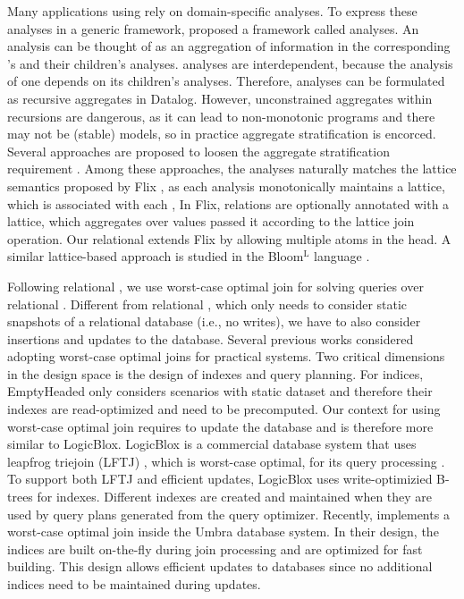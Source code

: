 Many applications using \egraphs rely on domain-specific analyses.
To express these analyses in a generic \egraph framework, 
 \egg proposed a framework called \eclass analyses.
An \eclass analysis can be thought of as an aggregation of 
 information in the corresponding \eclass's \enodes and their children's \eclass analyses.
\Eclass analyses are interdependent,
 because the \eclass analysis of one \eclass depends on its children's \eclass analyses.
Therefore,
 \eclass analyses can be formulated as recursive aggregates in Datalog.
However, unconstrained aggregates within recursions are dangerous, 
 as it can lead to non-monotonic programs and there may not be (stable) models,
 so in practice aggregate stratification is encorced.
Several approaches are proposed to loosen the aggregate stratification requirement 
 \citep{mono-agg,bloom-lattice,datalogo,prov-semiring,flix}.
Among these approaches,
 the \eclass analyses naturally matches the lattice semantics proposed by Flix \citep{flix},
 as each \eclass analysis monotonically maintains a lattice, which is associated with each \eclass,
In Flix, relations are optionally annotated with a lattice,
 which aggregates over values passed it according to the lattice join operation.
Our relational \egraphs extends Flix by allowing multiple atoms in the head.
A similar lattice-based approach is studied 
 in the Bloom$^\text{L}$ language \citep{bloom-lattice}.

Following relational \ematching \citep{relational-ematching}, 
 we use worst-case optimal join for solving queries over relational \egraphs.
Different from relational \ematching,
 which only needs to consider static snapshots of a relational database
 (i.e., no writes),
 we have to also consider insertions and updates to the database.
Several previous works considered 
 adopting worst-case optimal joins for practical systems.
Two critical dimensions in the design space is the design of indexes
 and query planning.
For indices,
 EmptyHeaded only considers scenarios with static dataset \citep{emptyheaded}
 and therefore their indexes are read-optimized and need to be precomputed.
Our context for using worst-case optimal join requires to update the database
 and is therefore more similar to LogicBlox.
LogicBlox is a commercial database system that uses leapfrog triejoin (LFTJ) \citep{lftj}, 
 which is worst-case optimal,
 for its query processing \citep{logicblox}.
To support both LFTJ and efficient updates, 
 LogicBlox uses write-optimizied B-trees for indexes.
Different indexes are created and maintained 
 when they are used by query plans generated from the query optimizer.
Recently, 
 \citet{umbra-wcoj} implements a worst-case optimal join 
 inside the Umbra database system.
In their design,
 the indices are built on-the-fly during join processing
 and are optimized for fast building.
This design allows efficient updates to databases 
 since no additional indices need to be maintained during updates.

